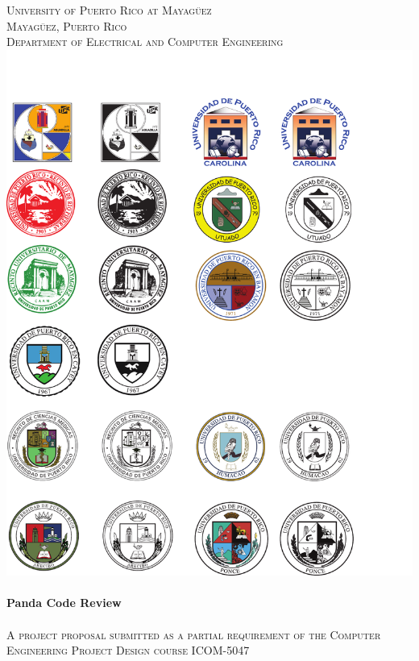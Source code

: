 \begin{titlepage}

\begin{center}


    

\textsc{\large University of Puerto Rico at Mayag\"{u}ez}\\[0.3cm]
\textsc{\large Mayag\"{u}ez, Puerto Rico}\\[0.3cm]
\textsc{\normalsize Department of Electrical and Computer Engineering}\\[1.3cm]
\includegraphics[scale=1.25]{res/logo_rum}\\[1cm]


\HRule \\[0.4cm]
{ \huge \bfseries Panda Code Review}\\
\HRule \\[0.3cm]
\textsc{A project proposal submitted as a partial requirement of the Computer Engineering Project Design course ICOM-5047}\\[0.7cm]


\end{center}
\end{titlepage}
